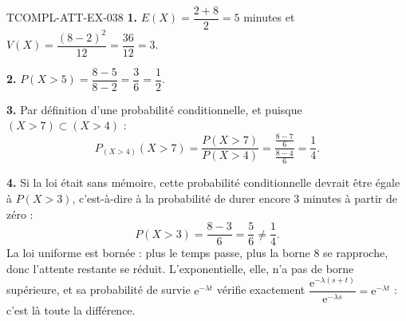 \begin{corrige}{TCOMPL-ATT-EX-038}
\textbf{1.} $E(X) = \dfrac{2+8}{2} = 5$ minutes et $V(X) = \dfrac{(8-2)^2}{12} = \dfrac{36}{12} = 3$.

\textbf{2.} $P(X>5) = \dfrac{8-5}{8-2} = \dfrac{3}{6} = \dfrac{1}{2}$.

\textbf{3.} Par définition d'une probabilité conditionnelle, et puisque $(X>7) \subset (X>4)$ :
\[
  P_{(X>4)}(X>7) = \frac{P(X>7)}{P(X>4)} = \frac{\frac{8-7}{6}}{\frac{8-4}{6}} = \frac{1}{4}.
\]

\textbf{4.} Si la loi était sans mémoire, cette probabilité conditionnelle devrait être égale à $P(X>3)$, c'est-à-dire à la probabilité de durer encore $3$ minutes à partir de zéro :
\[
  P(X>3) = \frac{8-3}{6} = \frac{5}{6} \neq \frac{1}{4}.
\]
La loi uniforme est bornée : plus le temps passe, plus la borne $8$ se rapproche, donc l'attente restante se réduit. L'exponentielle, elle, n'a pas de borne supérieure, et sa probabilité de survie $\mathrm{e}^{-\lambda t}$ vérifie exactement $\dfrac{\mathrm{e}^{-\lambda(s+t)}}{\mathrm{e}^{-\lambda s}} = \mathrm{e}^{-\lambda t}$ : c'est là toute la différence.
\end{corrige}
